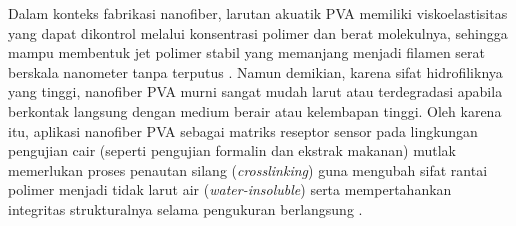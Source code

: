 Dalam konteks fabrikasi nanofiber, larutan akuatik PVA memiliki viskoelastisitas yang dapat dikontrol melalui konsentrasi polimer dan berat molekulnya, sehingga mampu membentuk jet polimer stabil yang memanjang menjadi filamen serat berskala nanometer tanpa terputus \cite{Turkoglu2024}. Namun demikian, karena sifat hidrofiliknya yang tinggi, nanofiber PVA murni sangat mudah larut atau terdegradasi apabila berkontak langsung dengan medium berair atau kelembapan tinggi. Oleh karena itu, aplikasi nanofiber PVA sebagai matriks reseptor sensor pada lingkungan pengujian cair (seperti pengujian formalin dan ekstrak makanan) mutlak memerlukan proses penautan silang (\textit{crosslinking}) guna mengubah sifat rantai polimer menjadi tidak larut air (\textit{water-insoluble}) serta mempertahankan integritas strukturalnya selama pengukuran berlangsung \cite{gaaz2015properties,shi2008citric}.

